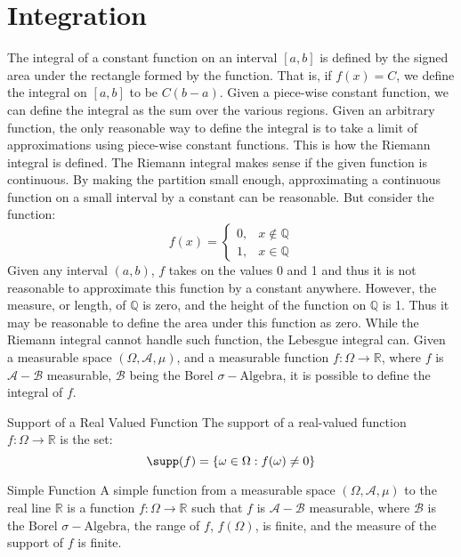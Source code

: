 \section{Integration}
    The integral of a constant function on an interval $[a,b]$ is defined by
    the signed area under the rectangle formed by the function. That is, if
    $f(x)=C$, we define the integral on $[a,b]$ to be $C(b-a)$. Given a
    piece-wise constant function, we can define the integral as the sum over the
    various regions. Given an arbitrary function, the only reasonable way to
    define the integral is to take a limit of approximations using piece-wise
    constant functions. This is how the Riemann integral is defined. The
    Riemann integral makes sense if the given function is continuous. By making
    the partition small enough, approximating a continuous function on a small
    interval by a constant can be reasonable. But consider the function:
    \begin{equation}
        f(x)=
        \begin{cases}
            0,&x\notin\mathbb{Q}\\
            1,&x\in\mathbb{Q}
        \end{cases}
    \end{equation}
    Given any interval $(a,b)$, $f$ takes on the values 0 and 1 and thus it is
    not reasonable to approximate this function by a constant anywhere. However,
    the measure, or length, of $\mathbb{Q}$ is zero, and the height of the
    function on $\mathbb{Q}$ is 1. Thus it may be reasonable to define the area
    under this function as zero. While the Riemann integral cannot handle such
    function, the Lebesgue integral can. Given a measurable space
    $(\Omega,\mathcal{A},\mu)$, and a measurable function
    $f:\Omega\rightarrow\mathbb{R}$, where $f$ is $\mathcal{A}-\mathcal{B}$
    measurable, $\mathcal{B}$ being the Borel $\sigma-\textrm{Algebra}$, it is
    possible to define the integral of $f$.
    \begin{ldefinition}{Support of a Real Valued Function}
        The support of a real-valued function
        $f:\Omega\rightarrow\mathbb{R}$ is the set:
        \begin{equation}
            \supp(f)=\{\omega\in\Omega:f(\omega)\ne{0}\}
        \end{equation}
    \end{ldefinition}
    \begin{ldefinition}{Simple Function}
        A simple function from a measurable space $(\Omega,\mathcal{A},\mu)$ to
        the real line $\mathbb{R}$ is a function $f:\Omega\rightarrow\mathbb{R}$
        such that $f$ is $\mathcal{A}-\mathcal{B}$ measurable, where
        $\mathcal{B}$ is the Borel $\sigma-\textrm{Algebra}$, the range of $f$,
        $f(\Omega)$, is finite, and the measure of the support of $f$ is finite.
    \end{ldefinition}
